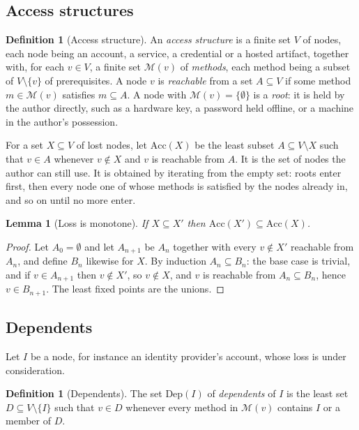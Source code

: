 \documentclass[11pt]{article}
\theoremstyle{plain}
\newtheorem{lemma}[theorem]{Lemma}
\theoremstyle{definition}
\newtheorem{definition}[theorem]{Definition}
\theoremstyle{remark}
\begin{document}
\subsection{Access structures}

\begin{definition}[Access structure]\label{def:access}
An \emph{access structure} is a finite set $V$ of nodes, each node being an account, a service, a credential or a hosted artifact, together with, for each $v\in V$, a finite set $\mathcal M(v)$ of \emph{methods}, each method being a subset of $V\setminus\{v\}$ of prerequisites. A node $v$ is \emph{reachable} from a set $A\subseteq V$ if some method $m\in\mathcal M(v)$ satisfies $m\subseteq A$. A node with $\mathcal M(v)=\{\emptyset\}$ is a \emph{root}: it is held by the author directly, such as a hardware key, a password held offline, or a machine in the author's possession.
\end{definition}

For a set $X\subseteq V$ of lost nodes, let $\mathrm{Acc}(X)$ be the least subset $A\subseteq V\setminus X$ such that $v\in A$ whenever $v\notin X$ and $v$ is reachable from $A$. It is the set of nodes the author can still use. It is obtained by iterating from the empty set: roots enter first, then every node one of whose methods is satisfied by the nodes already in, and so on until no more enter.

\begin{lemma}[Loss is monotone]\label{lem:lossmono}
If $X\subseteq X'$ then $\mathrm{Acc}(X')\subseteq\mathrm{Acc}(X)$.
\end{lemma}

\begin{proof}
Let $A_0=\emptyset$ and let $A_{n+1}$ be $A_n$ together with every $v\notin X'$ reachable from $A_n$, and define $B_n$ likewise for $X$. By induction $A_n\subseteq B_n$: the base case is trivial, and if $v\in A_{n+1}$ then $v\notin X'$, so $v\notin X$, and $v$ is reachable from $A_n\subseteq B_n$, hence $v\in B_{n+1}$. The least fixed points are the unions. \qedhere
\end{proof}

\subsection{Dependents}

Let $I$ be a node, for instance an identity provider's account, whose loss is under consideration.

\begin{definition}[Dependents]\label{def:dep}
The set $\mathrm{Dep}(I)$ of \emph{dependents} of $I$ is the least set $D\subseteq V\setminus\{I\}$ such that $v\in D$ whenever every method in $\mathcal M(v)$ contains $I$ or a member of $D$.
\end{definition}
\end{document}

